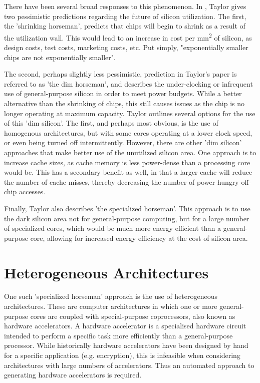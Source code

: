 \documentclass{UoYCSproject}
\begin{document}
There have been several broad responses to this phenomenon.
In \cite{four-horsemen}, Taylor gives two pessimistic predictions regarding the future of silicon
utilization. The first, the 'shrinking horseman', predicts that chips will begin to shrink as a result of
the utilization wall. This would lead to an increase in cost per mm\textsuperscript{2} of silicon, as
design costs, test costs, marketing costs, etc. Put simply, "exponentially smaller chips are not
exponentially smaller".

The second, perhaps slightly less pessimistic, prediction in Taylor's paper
is referred to as 'the dim horseman', and describes the under-clocking or infrequent use of
general-purpose silicon in order to meet power budgets. While a better alternative than the shrinking
of chips, this still causes issues as the chip is no longer operating at maximum capacity.
Taylor outlines several options for the use of this 'dim silicon'. The first, and perhaps most obvious,
is the use of homogenous architectures, but with some cores operating at a lower clock speed, or
even being turned off intermittently. However, there are other 'dim silicon' approaches that make better
use of the unutilized silicon area. One approach is to increase cache sizes, as cache memory is less
power-dense than a processing core would be. This has a secondary benefit as well, in that a larger
cache will reduce the number of cache misses, thereby decreasing the number of power-hungry off-chip
accesses.

Finally, Taylor also describes 'the specialized horseman'. This approach is to use the dark silicon area
not for general-purpose computing, but for a large number of specialized cores, which would be much
more energy efficient than a general-purpose core, allowing for increased energy efficiency at the
cost of silicon area.

\section{Heterogeneous Architectures}

One such 'specialized horseman' approach is the use of heterogeneous architectures.
These are computer architectures in which one or more general-purpose cores are coupled with special-purpose coprocessors,
also known as hardware accelerators. A hardware accelerator is a specialised hardware circuit intended to perform a
specific task more efficiently than a general-purpose processor. While historically hardware accelerators have been designed by
hand for a specific application (e.g. encryption), this is infeasible when considering architectures
with large numbers of accelerators. Thus an automated approach to generating hardware accelerators is required.
\end{document}
